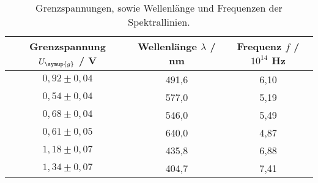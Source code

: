 \begin{table}[!htp]
\centering
\caption{Grenzspannungen, sowie Wellenlänge und Frequenzen der Spektrallinien.}
\label{tab:frequenz}
\begin{tabular}{c c c}
\toprule
{Grenzspannung $U_{\symup{g}}$ / V } & {Wellenlänge $\lambda$ / nm} & {Frequenz $f$ / $10^{14}$ Hz} \\
\midrule
$0,92 \pm 0,04$ & 491,6 & 6,10 \\
$0,54 \pm 0,04$ & 577,0 & 5,19 \\
$0,68 \pm 0,04$ & 546,0 & 5,49 \\
$0,61 \pm 0,05$ & 640,0 & 4,87 \\
$1,18 \pm 0,07$ & 435,8 & 6,88 \\
$1,34 \pm 0,07$ & 404,7 & 7,41 \\
\bottomrule
\end{tabular}
\end{table}